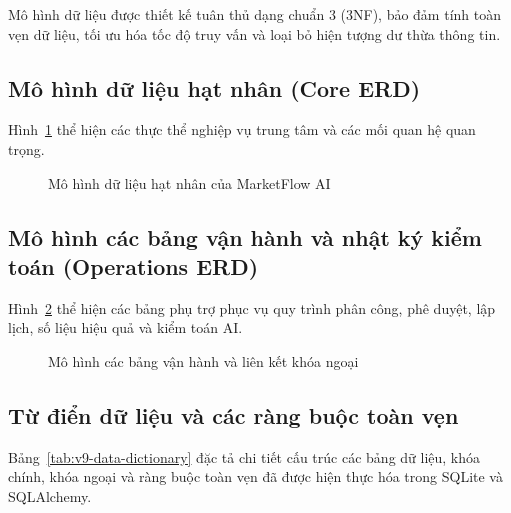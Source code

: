 Mô hình dữ liệu được thiết kế tuân thủ dạng chuẩn 3 (3NF), bảo đảm tính toàn vẹn dữ liệu, tối ưu hóa tốc độ truy vấn và loại bỏ hiện tượng dư thừa thông tin.

\subsection{Mô hình dữ liệu hạt nhân (Core ERD)}
Hình~\ref{fig:v9-erd-core} thể hiện các thực thể nghiệp vụ trung tâm và các mối quan hệ quan trọng.

\begin{figure}[H]
\centering

\caption{Mô hình dữ liệu hạt nhân của MarketFlow AI}
\label{fig:v9-erd-core}
\end{figure}

\subsection{Mô hình các bảng vận hành và nhật ký kiểm toán (Operations ERD)}
Hình~\ref{fig:v9-erd-ops} thể hiện các bảng phụ trợ phục vụ quy trình phân công, phê duyệt, lập lịch, số liệu hiệu quả và kiểm toán AI.

\begin{figure}[H]
\centering

\caption{Mô hình các bảng vận hành và liên kết khóa ngoại}
\label{fig:v9-erd-ops}
\end{figure}

\subsection{Từ điển dữ liệu và các ràng buộc toàn vẹn}
Bảng~\ref{tab:v9-data-dictionary} đặc tả chi tiết cấu trúc các bảng dữ liệu, khóa chính, khóa ngoại và ràng buộc toàn vẹn đã được hiện thực hóa trong SQLite và SQLAlchemy.

